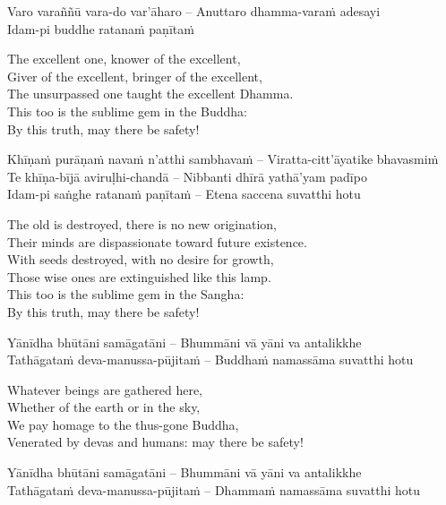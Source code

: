 Varo varaññū vara-do var'āharo – Anuttaro dhamma-varaṁ adesayi\\
Idam-pi buddhe ratanaṁ paṇītaṁ

\begin{english-verses}
  The excellent one, knower of the excellent,\\
  Giver of the excellent, bringer of the excellent,\\
  The unsurpassed one taught the excellent Dhamma.\\
  This too is the sublime gem in the Buddha:\\
  By this truth, may there be safety!
\end{english-verses}

Khīṇaṁ purāṇaṁ navaṁ n'atthi sambhavaṁ – Viratta-citt'āyatike bhavasmiṁ\\
Te khīṇa-bījā aviruḷhi-chandā – Nibbanti dhīrā yathā'yam padīpo\\
Idam-pi saṅghe ratanaṁ paṇītaṁ – Etena saccena suvatthi hotu

\begin{english-verses}
  The old is destroyed, there is no new origination,\\
  Their minds are dispassionate toward future existence.\\
  With seeds destroyed, with no desire for growth,\\
  Those wise ones are extinguished like this lamp.\\
  This too is the sublime gem in the Sangha:\\
  By this truth, may there be safety!
\end{english-verses}

Yānīdha bhūtāni samāgatāni – Bhummāni vā yāni va antalikkhe\\
Tathāgataṁ deva-manussa-pūjitaṁ – Buddhaṁ namassāma suvatthi hotu

\begin{english-verses}
  Whatever beings are gathered here,\\
  Whether of the earth or in the sky,\\
  We pay homage to the thus-gone Buddha,\\
  Venerated by devas and humans: may there be safety!
\end{english-verses}

Yānīdha bhūtāni samāgatāni – Bhummāni vā yāni va antalikkhe\\
Tathāgataṁ deva-manussa-pūjitaṁ – Dhammaṁ namassāma suvatthi hotu

